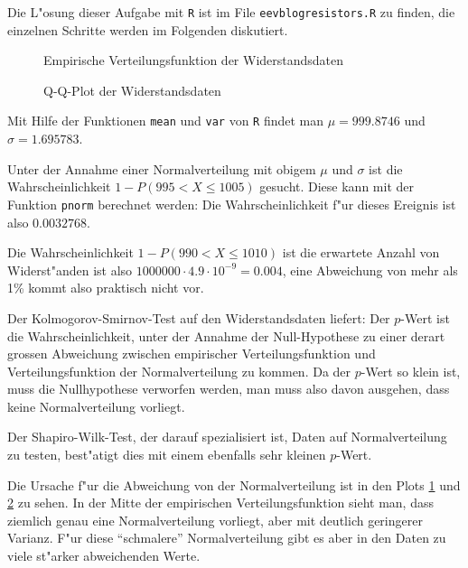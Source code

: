 \begin{loesung}
Die L"osung dieser Aufgabe mit {\tt R} ist im File {\tt eevblogresistors.R}
zu finden, die einzelnen Schritte werden im Folgenden diskutiert.
\begin{figure}
\begin{center}
\end{center}
\caption{Empirische Verteilungsfunktion der Widerstandsdaten\label{80000020-ecdf}}
\end{figure}
\begin{figure}
\begin{center}
\end{center}
\caption{Q-Q-Plot der Widerstandsdaten\label{80000020-qq}}
\end{figure}
\begin{teilaufgaben}
\item
Mit Hilfe der Funktionen {\tt mean} und {\tt var} von {\tt R} findet man
$\mu= 999.8746$ und $\sigma= 1.695783$.
\item
Unter der Annahme einer Normalverteilung mit obigem $\mu$ und $\sigma$
ist die Wahrscheinlichkeit
$1-P(995 < X \le 1005)$ gesucht.
Diese kann mit der Funktion {\tt pnorm} berechnet werden:
Die Wahrscheinlichkeit f"ur dieses Ereignis ist also $0.0032768$.
\item
Die Wahrscheinlichkeit $1-P(990 < X \le 1010)$ ist 
die erwartete Anzahl von Widerst"anden ist also
$1000000 \cdot 4.9\cdot 10^{-9}=0.004$, eine Abweichung von mehr als 1\%
kommt also praktisch nicht vor.
\item
Der Kolmogorov-Smirnov-Test auf den Widerstandsdaten liefert:
{\small
{}
}
Der $p$-Wert ist die Wahrscheinlichkeit, unter der Annahme der Null-Hypothese
zu einer derart grossen Abweichung zwischen empirischer Verteilungsfunktion
und Verteilungsfunktion der Normalverteilung zu kommen. Da der $p$-Wert
so klein ist, muss die Nullhypothese verworfen werden, man muss also davon
ausgehen, dass keine Normalverteilung vorliegt.

Der Shapiro-Wilk-Test, der darauf spezialisiert ist, Daten auf Normalverteilung
zu testen, best"atigt dies mit einem ebenfalls sehr kleinen $p$-Wert.

Die Ursache f"ur die Abweichung von der Normalverteilung ist in den Plots
\ref{80000020-ecdf} und \ref{80000020-qq} zu
sehen. In der Mitte der empirischen Verteilungsfunktion sieht man, dass
ziemlich genau eine Normalverteilung vorliegt, aber mit deutlich
geringerer Varianz.
F"ur diese ``schmalere'' Normalverteilung gibt es aber in den Daten
zu viele st"arker abweichenden Werte.
\end{teilaufgaben}
\end{loesung}

